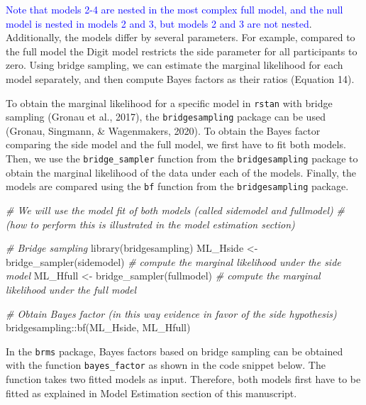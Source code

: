 \documentclass[
  english,
  doc,floatsintext]{apa6}
\newenvironment{Shaded}{\begin{snugshade}}{\end{snugshade}}
\newcommand{\CommentTok}[1]{\textcolor[rgb]{0.56,0.35,0.01}{\textit{#1}}}
\newcommand{\FunctionTok}[1]{\textcolor[rgb]{0.00,0.00,0.00}{#1}}
\newcommand{\NormalTok}[1]{#1}
\newcommand{\OtherTok}[1]{\textcolor[rgb]{0.56,0.35,0.01}{#1}}
\newcommand{\SpecialCharTok}[1]{\textcolor[rgb]{0.00,0.00,0.00}{#1}}
\begin{document}
\textcolor{blue}{Note that models 2-4 are nested in the most complex full model, and the null model is nested in models 2 and 3, but models 2 and 3 are not nested}. Additionally, the models differ by several parameters. For example, compared to the full model the Digit model restricts the side parameter for all participants to zero. Using bridge sampling, we can estimate the marginal likelihood for each model separately, and then compute Bayes factors as their ratios (Equation 14).

To obtain the marginal likelihood for a specific model in \texttt{rstan} with bridge sampling (Gronau et al., 2017), the \texttt{bridgesampling} package can be used (Gronau, Singmann, \& Wagenmakers, 2020). To obtain the Bayes factor comparing the side model and the full model, we first have to fit both models. Then, we use the \texttt{bridge\_sampler} function from the \texttt{bridgesampling} package to obtain the marginal likelihood of the data under each of the models. Finally, the models are compared using the \texttt{bf} function from the \texttt{bridgesampling} package.
~

\scriptsize

\begin{Shaded}
\begin{Highlighting}[]
\CommentTok{\# We will use the model fit of both models (called sidemodel and fullmodel)}
\CommentTok{\# (how to perform this is illustrated in the model estimation section)}

\CommentTok{\# Bridge sampling }
\FunctionTok{library}\NormalTok{(bridgesampling)}
\NormalTok{ML\_Hside }\OtherTok{\textless{}{-}} \FunctionTok{bridge\_sampler}\NormalTok{(sidemodel)  }\CommentTok{\# compute the marginal likelihood under the side model }
\NormalTok{ML\_Hfull }\OtherTok{\textless{}{-}} \FunctionTok{bridge\_sampler}\NormalTok{(fullmodel)  }\CommentTok{\# compute the marginal likelihood under the full model }

\CommentTok{\# Obtain Bayes factor (in this way evidence in favor of the side hypothesis)}
\NormalTok{bridgesampling}\SpecialCharTok{::}\FunctionTok{bf}\NormalTok{(ML\_Hside, ML\_Hfull)}
\end{Highlighting}
\end{Shaded}

\normalsize

In the \texttt{brms} package, Bayes factors based on bridge sampling can be obtained with the function \texttt{bayes\_factor} as shown in the code snippet below. The function takes two fitted models as input. Therefore, both models first have to be fitted as explained in Model Estimation section of this manuscript.
\end{document}
